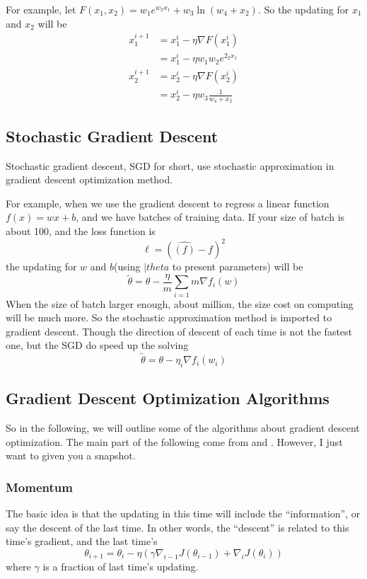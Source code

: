 \documentclass{article}
\begin{document}
For example, let $F(x_1,x_2)=w_1e^{w_2x_1}+w_3\ln(w_4+x_2)$. So the updating for $x_1$ and $ x_2$ will be 
\begin{align*}
x_1^{i+1} &= x_1^i - \eta\nabla F(x_1^i) \\ &= x_1^i - \eta w_1w_2e^{2_2x_1} \\
x_2^{i+1} &= x_2^i - \eta\nabla F(x_2^i) \\ &= x_2^i -\eta w_3\frac{1}{w_4+x_2}
\end{align*}

\subsection{Stochastic Gradient Descent}
\label{aec:gd:sgd}

Stochastic gradient descent, SGD for short, use stochastic approximation in gradient descent optimization method.

For example, when we use the gradient descent to regress a linear function $f(x) = wx+b$, and we have batches of training data.
If your size of batch is about 100, and the loss function is
\[
\ell = (\hat{(f)} - f)^2
\]
the updating for $w$ and $b$(using $|theta$ to present parameters) will be
\[
\tilde{\theta} = \theta - \frac{\eta}{m}\sum\limits_{i=1}{m}\nabla f_i(w)
\]
When the size of batch larger enough, about million, the size cost on computing will be much more.
So the stochastic approximation method is imported to gradient descent. Though the direction of descent of each time is not
the fastest one, but the SGD do speed up the solving
\[
\tilde{\theta} = \theta - \eta _i\nabla f_i(w_i)
\]

\subsection{Gradient Descent Optimization Algorithms}
\label{sec:gd:gdoa}

So in the following, we will outline some of the algorithms about gradient descent optimization. The main part of the following come from
\cite{DBLP:journals/corr/Ruder16} and \cite{wikipedia:sgd}. However, I just want to given you a snapshot.

\subsubsection{Momentum}
\label{sec:gd:gdoa:momentum}

The basic idea is that the updating in this time will include the ``information'', or say the descent of the last time.
In other words, the ``descent'' is related to this time's gradient, and the last time's
\[
\theta_{i+1} = \theta_i - \eta\left(\gamma\nabla_{i-1}J(\theta_{i-1}) + \nabla_iJ(\theta_i)\right)
\]
where $\gamma$ is a fraction of last time's updating.
\end{document}
